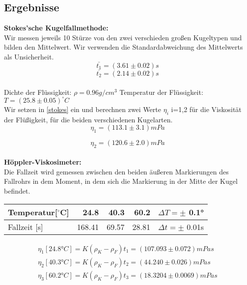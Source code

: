 \documentclass{article}
\begin{document}
\subsection{Ergebnisse}
\textbf{Stokes'sche Kugelfallmethode:}\\
Wir messen jeweils 10 Stürze von den zwei verschieden großen Kugeltypen und bilden den Mittelwert. Wir verwenden die Standardabweichung des Mittelwerts als Unsicherheit.
$$\bar{t_1}=(3.61\pm0.02)s$$
$$\bar{t_2}=(2.14\pm0.02)s$$
\\
Dichte der Flüssigkeit: $\rho=0.96 g/cm^3$
Temperatur der Flüssigkeit: $T=(25.8 \pm 0.05)^\circ C$
\\
Wir setzen in \ref{stokes} ein und berechnen zwei Werte $\eta_i$ i=1,2 für die Viskosität der Flüßigkeit, für die beiden verschiedenen Kugelarten. \\

$$  \eta_1 =   (113.1 \pm 3.1)mPa $$ 
 
$$  \eta_2 =   (120.6 \pm 2.0)mPa $$ \\

\textbf{Höppler-Viskosimeter:}\\
Die Fallzeit wird gemessen zwischen den beiden äußeren Markierungen des Fallrohrs in dem Moment, in dem sich die Markierung in der Mitte der Kugel befindet.\\
\begin{center}
\begin{tabular}{|l||r|r|r||r|}
\hline
Temperatur[$^\circ$C] & 24.8 & 40.3 & 60.2 & $\Delta T=\pm$ 0.1°\\
\hline
Fallzeit [s] & 168.41 & 69.57 &  28.81 & $\Delta t=\pm$ 0.01s\\
\hline
\end{tabular}
\end{center}
\begin{gather*}
\eta_1[24.8°C] = K (\rho_K - \rho_F)t_1%
=(107.093 \pm 0.072) mPa s\\
\eta_2[40.3°C] = K (\rho_K - \rho_F)t_2%
= (44.240 \pm 0.026) mPa s\\
\eta_3[60.2°C] = K (\rho_K - \rho_F)t_3%
= (18.3204 \pm 0.0069) mPa s\\
\end{gather*}
\end{document}
